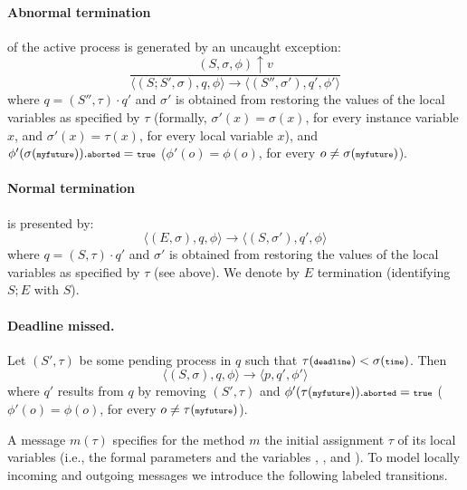 \paragraph*{Abnormal termination} of the active process is generated by an uncaught exception:
$$
\frac
{(S,\sigma,\phi)\uparrow v}
{\langle (S;S', \sigma), q, \phi\rangle \rightarrow \langle (S'',\sigma'), q', \phi'\rangle}
$$
where $q = (S'',\tau) \cdot q' $ and $\sigma'$ is obtained from restoring the values of the local variables
as specified by $\tau$ (formally, $\sigma'(x)=\sigma(x)$, for every instance variable $x$, and $\sigma'(x)=\tau(x)$, for every local variable $x$), and  $\phi'(\sigma({\scriptsize\texttt{myfuture}})).{\scriptsize\texttt{aborted}} = {\scriptsize\texttt{true}}$
($\phi'(o)=\phi(o)$, for every $o\not= \sigma({\scriptsize\texttt{myfuture}})$).

\paragraph*{Normal termination} is presented by:
$$
\langle (E, \sigma), q, \phi\rangle \rightarrow \langle  (S,\sigma'), q', \phi\rangle
$$
where $q = (S,\tau) \cdot q'$ and $\sigma'$ is obtained from restoring the values of the local variables
as specified by $\tau$ (see above).
We denote by $E$ termination (identifying $S;E$ with $S$).



\paragraph*{Deadline missed.}
Let  $(S', \tau)$ be some  pending process  in $q$ such that $\tau(\textbf{{\scriptsize\texttt{deadline}}}) < \sigma({\scriptsize\texttt{time}})$.
Then
$$
\langle  (S,\sigma), q, \phi\rangle \rightarrow \langle p, q', \phi'\rangle 
$$
where $q'$ results from $q$ by removing $(S',\tau)$ and $\phi'(\tau({\scriptsize\texttt{myfuture}})).{\scriptsize\texttt{aborted}} = {\scriptsize\texttt{true}}$
($\phi'(o)=\phi(o)$, for every $o\not= \tau({\scriptsize\texttt{myfuture}})$).


\bigskip
A message $m(\tau)$ specifies for the method $m$ the  initial assignment $\tau$ of its  local variables
(i.e., the formal parameters and the variables , , and ).
To model locally incoming and outgoing  messages we introduce the following
labeled transitions.


